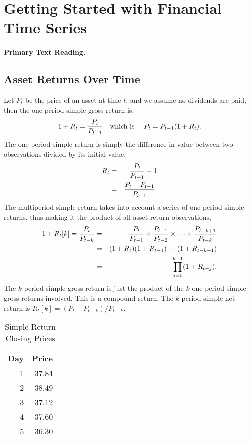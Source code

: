 \section{Getting Started with Financial Time Series}
\paragraph{Primary Text Reading.} 

\subsection{Asset Returns Over Time}
Let $P_t$ be the price of an asset at time $t$, and we assume no dividends are paid, then the one-period simple gross return is,
\begin{equation}
1 + R_t = \frac{P_t}{P_{t-1}} \text{\quad which is \quad} P_t = P_{t-1}(1 + R_t).
\end{equation}
The one-period simple return is simply the difference in value between two observations divided by its initial value,
\begin{eqnarray}
R_t &=& \frac{P_t}{P_{t-1}} -1 \label{eq:1pd-ret} \\
&=& \frac{P_t - P_{t-1}}{P_{t-1}}. \notag
\end{eqnarray}
The multiperiod simple return takes into account a series of one-period simple returns, thus making it the product of all asset return observations,
\begin{eqnarray}
1+R_t[k] = \frac{P_t}{P_{t-k}} &=& \frac{P_t}{P_{t-1}} \times \frac{P_{t-1}}{P_{t-2}} \times \cdots \times \frac{P_{t-k+1}}{P_{t-k}} \label{eq:multiperiod} \\
&=& (1+R_t)(1+R_{t-1})\cdots(1+R_{t-k+1}) \notag \\
&=& \prod^{k-1}_{j=0}(1+R_{t-j}). \notag
\end{eqnarray}
The $k$-period simple gross return is just the product of the $k$ one-period simple gross returns involved. This is a compound return. The $k$-period simple net return is \linebreak $R_t[k]=(P_t - P_{t-k})/P_{t-k}$.

\begin{table}[htbp]
   \centering
   \begin{tabular}{rr}
      \toprule
      Day & Price \\
      \hline
      1 & 37.84 \\
      2 & 38.49 \\
      3 & 37.12 \\
      4 & 37.60 \\
      5 & 36.30 \\
      \bottomrule
   \end{tabular}
   \caption{Simple Return Closing Prices}
   \label{tab:simp-rets}
\end{table}

